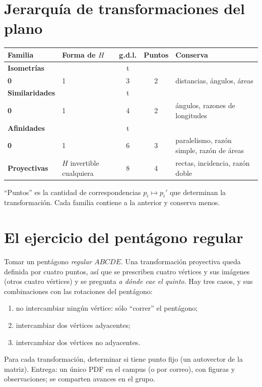 \section{Jerarquía de transformaciones del plano}\label{sec:jerarquia}

\begin{center}
\begin{tabularx}{\textwidth}{>{\bfseries}p{24mm} p{44mm} c c X}
\toprule
Familia & Forma de \(H\) & g.d.l. & Puntos & Conserva\\
\midrule
Isometrías & \(\begin{pmatrix}R&t\\0&1\end{pmatrix}\), \(R^TR=I\) & 3 & 2 &
distancias, ángulos, áreas\\
Similaridades & \(\begin{pmatrix}kR&t\\0&1\end{pmatrix}\) & 4 & 2 &
ángulos, razones de longitudes\\
Afinidades & \(\begin{pmatrix}A&t\\0&1\end{pmatrix}\), \(\det A\neq0\) & 6 & 3 &
paralelismo, razón simple, razón de áreas\\
Proyectivas & \(H\) invertible cualquiera & 8 & 4 &
rectas, incidencia, razón doble\\
\bottomrule
\end{tabularx}
\end{center}
``Puntos'' es la cantidad de correspondencias \(p_i\mapsto p_i'\) que determinan la
transformación. Cada familia contiene a la anterior y conserva menos.

\section{El ejercicio del pentágono regular}

\begin{enunciado}
Tomar un pentágono \emph{regular} \(ABCDE\). Una transformación proyectiva queda definida
por cuatro puntos, así que se prescriben cuatro vértices y sus imágenes (otros cuatro
vértices) y se pregunta \emph{a dónde cae el quinto}. Hay tres casos, y sus combinaciones
con las rotaciones del pentágono:
\begin{enumerate}[label=(\alph*)]
  \item no intercambiar ningún vértice: sólo ``correr'' el pentágono;
  \item intercambiar dos vértices adyacentes;
  \item intercambiar dos vértices no adyacentes.
\end{enumerate}
Para cada transformación, determinar si tiene punto fijo (un autovector de la matriz).
Entrega: un único PDF en el campus (o por correo), con figuras y observaciones; se
comparten avances en el grupo.
\end{enunciado}

